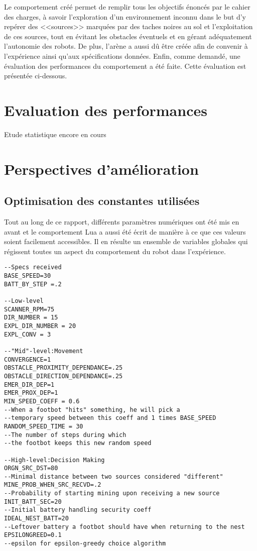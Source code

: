 Le comportement créé permet de remplir tous les objectifs énoncés par le cahier des charges, à savoir l'exploration d'un environnement inconnu dans le but d'y repérer des <<sources>> marquées par des taches noires au sol et l'exploitation de ces sources, tout en évitant les obstacles éventuels et en gérant adéquatement l'autonomie des robots. De plus, l'arène a aussi dû être créée afin de convenir à l'expérience ainsi qu'aux spécifications données. Enfin, comme demandé, une évaluation des performances du comportement a été faite. Cette évaluation est présentée ci-dessous.

\section{Evaluation des performances}

Etude statistique encore en cours

\section{Perspectives d'amélioration}

\subsection{Optimisation des constantes utilisées}
Tout au long de ce rapport, différents paramètres numériques ont été mis en avant et le comportement Lua a aussi été écrit de manière à ce que ces valeurs soient facilement accessibles. Il en résulte un ensemble de variables globales qui régissent toutes un aspect du comportement du robot dans l'expérience.

\begin{lstlisting}[caption=Définitions des variables globales]
--Specs received
BASE_SPEED=30
BATT_BY_STEP =.2

--Low-level
SCANNER_RPM=75
DIR_NUMBER = 15
EXPL_DIR_NUMBER = 20
EXPL_CONV = 3

--"Mid"-level:Movement
CONVERGENCE=1
OBSTACLE_PROXIMITY_DEPENDANCE=.25
OBSTACLE_DIRECTION_DEPENDANCE=.25
EMER_DIR_DEP=1
EMER_PROX_DEP=1
MIN_SPEED_COEFF = 0.6
--When a footbot "hits" something, he will pick a
--temporary speed between this coeff and 1 times BASE_SPEED
RANDOM_SPEED_TIME = 30
--The number of steps during which
--the footbot keeps this new random speed

--High-level:Decision Making
ORGN_SRC_DST=80
--Minimal distance between two sources considered "different"
MINE_PROB_WHEN_SRC_RECVD=.2
--Probability of starting mining upon receiving a new source
INIT_BATT_SEC=20
--Initial battery handling security coeff
IDEAL_NEST_BATT=20
--Leftover battery a footbot should have when returning to the nest
EPSILONGREED=0.1
--epsilon for epsilon-greedy choice algorithm
\end{lstlisting}

